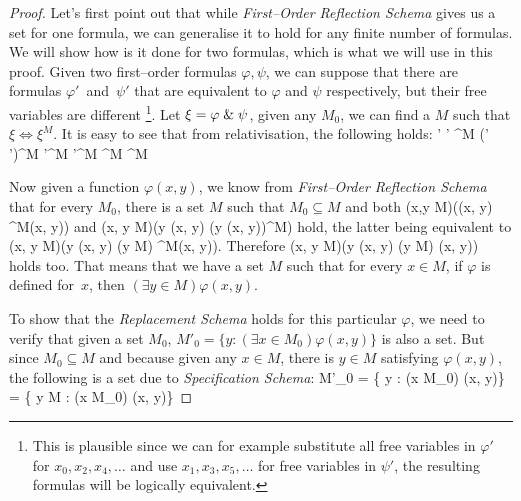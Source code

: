 \begin{proof}
Let's first point out that while \emph{First–Order Reflection Schema} gives us a set for one formula, we can generalise it to hold for any finite number of formulas. We will show how is it done for two formulas, which is what we will use in this proof. Given two first–order formulas $\varphi, \psi$, we can suppose that there are formulas $\varphi'$~and~$\psi'$ that are equivalent to $\varphi$ and $\psi$ respectively, but their free variables are different \footnote{This is plausible since we can for example substitute all free variables in $\varphi'$ for $x_0, x_2, x_4, \ldots$ and use $x_1, x_3, x_5, \ldots$ for free variables in $\psi'$, the resulting formulas will be logically equivalent.}. Let $\xi = \varphi \mathrel{\&} \psi$, given any $M_0$, we can find a $M$ such that $\xi \iff \xi^M$. It is easy to see that from relativisation, the following holds:
\beq
\varphi \et \psi \iff \varphi' \et \psi' \iff \xi \iff \xi^M \iff (\varphi' \et \psi')^M \iff \varphi'^M \et \psi'^M \iff \varphi^M \et \psi^M
\eeq

Now given a function $\varphi(x, y)$, we know from \emph{First–Order Reflection Schema} that for every $M_0$, there is a set $M$ such that $M_0 \subseteq M$ and both
\beq
(\forall x,y \in M)(\varphi(x, y) \iff \varphi^M(x, y))
\eeq 
and
\beq
(\forall x, y \in M)(\exists y \varphi(x, y) \iff (\exists y \varphi(x, y))^M)
\eeq 
hold, the latter being equivalent to 
\beq
(\forall x, y \in M)(\exists y \varphi(x, y) \iff (\exists y \in M) \varphi^M(x, y))\mbox{.}
\eeq
Therefore 
\beq
(\forall x, y \in M)(\exists y \varphi(x, y) \iff (\exists y \in M) \varphi(x, y))
\eeq
holds too.
That means that we have a set $M$ such that for every $x \in M$, if $\varphi$ is defined for~$x$, then $(\exists y \in M) \varphi(x, y)$. 

To show that the \emph{Replacement Schema} holds for this particular $\varphi$, we need to verify that given a set $M_0$, $M'_0 = \{ y : (\exists x \in M_0) \varphi(x, y)\}$ is also a set. But since $M_0 \subseteq M$ and because given any $x \in M$, there is $y \in M$ satisfying $\varphi(x, y)$, the following is a set due to \emph{Specification Schema}:
\beq
M'_0 = \{ y : (\exists x \in M_0) \varphi(x, y)\} = \{ y \in M : (\exists x \in M_0) \varphi(x, y)\}
\eeq

\ece
\end{proof}


